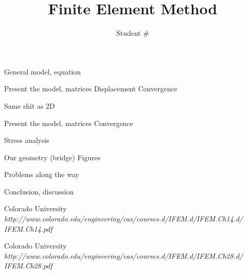 \documentclass[9pt]{extarticle}
\title{Finite Element Method}
\author{Student \# }
\begin{document}
\maketitle



General model, equation




Present the model, matrices
Displacement
Convergence





Same shit as 2D

Present the model, matrices
Convergence
%

Stress analysis



Our geometry (bridge)
Figures

Problems along the way


Conclusion, discussion



\begin{thebibliography}{2}

	Colorado University\\
	\emph{http://www.colorado.edu/engineering/cas/courses.d/IFEM.d/IFEM.Ch14.d/\\IFEM.Ch14.pdf}


	Colorado University\\
	\emph{http://www.colorado.edu/engineering/cas/courses.d/IFEM.d/IFEM.Ch28.d/\\IFEM.Ch28.pdf}	
\end{thebibliography}
\end{document}
